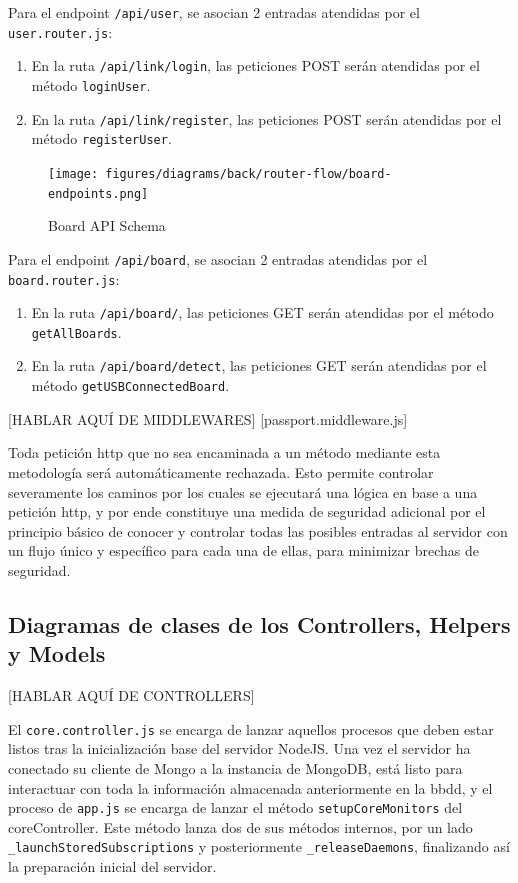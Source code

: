 Para el endpoint \verb|/api/user|, se asocian 2 entradas atendidas por el \verb|user.router.js|:
\begin{enumerate}
\item En la ruta \verb|/api/link/login|, las peticiones POST serán atendidas por el método \verb|loginUser|.
\item En la ruta \verb|/api/link/register|, las peticiones POST serán atendidas por el método \verb|registerUser|.
\end{enumerate}

\begin{figure}[hbt!]
\centering
\texttt{[image: figures/diagrams/back/router-flow/board-endpoints.png]}
\caption[board-endpoints]{Board API Schema\footnotemark}
\end{figure}

Para el endpoint \verb|/api/board|, se asocian 2 entradas atendidas por el \verb|board.router.js|:
\begin{enumerate}
\item En la ruta \verb|/api/board/|, las peticiones GET serán atendidas por el método \verb|getAllBoards|.
\item En la ruta \verb|/api/board/detect|, las peticiones GET serán atendidas por el método \verb|getUSBConnectedBoard|.
\end{enumerate}

[HABLAR AQUÍ DE MIDDLEWARES]
[passport.middleware.js]


Toda petición http que no sea encaminada a un método mediante esta metodología será automáticamente rechazada. Esto permite controlar severamente los caminos por los cuales se ejecutará una lógica en base a una petición http, y por ende constituye una medida de seguridad adicional por el principio básico de conocer y controlar todas las posibles entradas al servidor con un flujo único y específico para cada una de ellas, para minimizar brechas de seguridad.

\subsection{Diagramas de clases de los Controllers, Helpers y Models}
\label{makereference4.7.4}

[HABLAR AQUÍ DE CONTROLLERS]

El \verb|core.controller.js| se encarga de lanzar aquellos procesos que deben estar listos tras la inicialización base del servidor NodeJS. Una vez el servidor ha conectado su cliente de Mongo a la instancia de MongoDB, está listo para interactuar con toda la información almacenada anteriormente en la \gls{bbdd}, y el proceso de \verb|app.js| se encarga de lanzar el método \verb|setupCoreMonitors| del coreController. Este método lanza dos de sus métodos internos, por un lado \verb|_launchStoredSubscriptions| y posteriormente \verb|_releaseDaemons|, finalizando así la preparación inicial del servidor.

